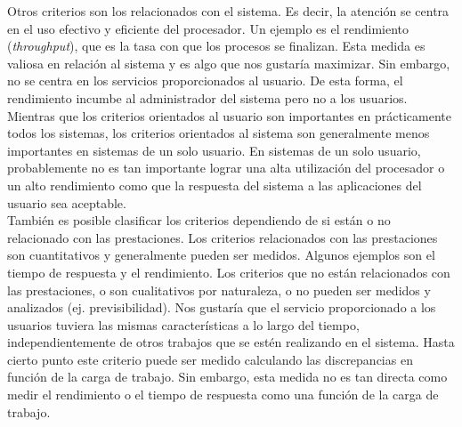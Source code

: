 \documentclass{article}
\begin{document}
				Otros criterios son los relacionados con el sistema. Es decir, la atención se centra en el uso efectivo y eficiente del procesador. Un ejemplo es el rendimiento (\textit{throughput}), que es la tasa con que los procesos se finalizan. Esta medida es valiosa en relación al sistema y es algo que nos gustaría maximizar. Sin embargo, no se centra en los servicios proporcionados al usuario. De esta forma, el rendimiento incumbe al administrador del sistema pero no a los usuarios. \\
				
				Mientras que los criterios orientados al usuario son importantes en prácticamente todos los sistemas, los criterios orientados al sistema son generalmente menos importantes en sistemas de un solo usuario. En sistemas de un solo usuario, probablemente no es tan importante lograr una alta utilización del procesador o un alto rendimiento como que la respuesta del sistema a las aplicaciones del usuario sea aceptable.\\
				
				También es posible clasificar los criterios dependiendo de si están o no relacionado con las prestaciones. Los criterios relacionados con las prestaciones son cuantitativos y generalmente pueden ser medidos. Algunos ejemplos son el tiempo de respuesta y el rendimiento. Los criterios que no están relacionados con las prestaciones, o son cualitativos por naturaleza, o no pueden ser medidos y analizados (ej. previsibilidad). Nos gustaría que el servicio proporcionado a los usuarios tuviera las mismas características a lo largo del tiempo, independientemente de otros trabajos que se estén realizando en el sistema. Hasta cierto punto este criterio puede ser medido calculando las discrepancias en función de la carga de trabajo. Sin embargo, esta medida no es tan directa como medir el rendimiento o el tiempo de respuesta como una función de la carga de trabajo. \\
				
\end{document}
